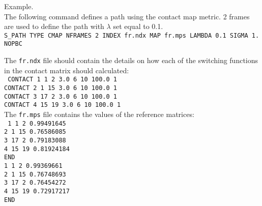 \documentclass[12pt,fleqn]{report}
\newcommand{\esempio}[1]{
\vspace{10pt}
\begin{flushright}
\colorbox{light-gray}{
   \begin{minipage}{13cm}
       \scriptsize{
{\fontfamily{phv} \fontseries{b}
 \selectfont Example. \\
 \fontseries{m} \selectfont #1 } }
\end{minipage}}
\end{flushright}
\vspace{20pt}
}
\begin{document}
 \esempio{The following command defines a path 
 using the contact map metric. 2 frames are used to 
 define the path with $\lambda$ set equal to 0.1. 
 \vspace{10pt} \\
 {\tt S\_PATH TYPE CMAP NFRAMES 2 INDEX fr.ndx MAP fr.mps LAMBDA 0.1 SIGMA 1. NOPBC}

 \vspace{5pt}
 The {\tt  fr.ndx} file should contain the details on how each of the switching functions 
 in the contact matrix should calculated: \vspace{10pt} \\ 
 {\tt 
CONTACT    1    1    2   3.0  6 10 100.0    1 \\
CONTACT    2    1   15   3.0  6 10 100.0    1 \\
CONTACT    3   17    2   3.0  6 10 100.0    1 \\
CONTACT    4   15   19   3.0  6 10 100.0    1} \\

The {\tt  fr.mps} file contains the values of the reference matrices:  \vspace{10pt} \\ 
{\tt 
   1    1    2      0.99491645\\
   2    1   15      0.76586085\\
   3   17    2      0.79183088\\
   4   15   19      0.81924184\\
END\\
   1    1    2      0.99369661\\
   2    1   15      0.76748693\\
   3   17    2      0.76454272\\
   4   15   19      0.72917217\\
END }
 }
\end{document}

